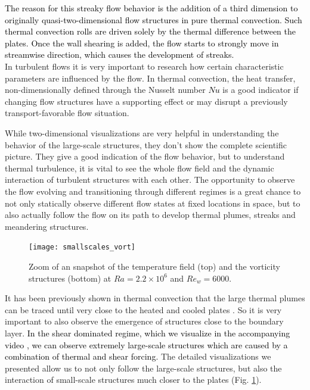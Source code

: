 \documentclass[5p,times]{elsarticle}
\begin{document}
\textcolor{black}{The reason for this streaky flow behavior is the addition of a third dimension to originally quasi-two-dimensional flow structures in pure thermal convection. Such thermal convection rolls are driven solely by the thermal difference between the plates. Once the wall shearing is added, the flow starts to strongly move in streamwise direction, which causes the development of streaks.} \\

In turbulent flows it is very important to research how certain characteristic
parameters are influenced by the flow. In thermal convection, the heat transfer, non-dimensionally
defined through the Nusselt number \textcolor{black}{$Nu$} is a good indicator if changing flow structures have a supporting effect or may disrupt a previously transport-favorable flow situation. 




While two-dimensional visualizations are very helpful in understanding the behavior of the large-scale structures, they don't show the complete scientific picture. They give a good indication of the flow behavior, but to understand thermal turbulence, it is vital to see the whole flow field and the dynamic interaction of turbulent structures with each other.
The opportunity to observe the flow evolving and transitioning through different regimes is a great chance to not only statically observe different flow states at fixed locations in space, but to also actually follow the flow on its path to develop thermal plumes, streaks and meandering structures.


\begin{figure}
	\centering
	\texttt{[image: smallscales\_vort]}%
	\caption{\label{fig:smallscale} Zoom of an snapshot of the temperature field (top) and the vorticity structures (bottom) at $ Ra=2.2 \times 10^6 $ and $ Re_w=6000 $.}
\end{figure}

It has been previously shown in thermal convection that the large thermal plumes can be traced until very close to the heated and cooled plates \cite{ste18}. So it is very important to also observe the emergence of structures close to the boundary layer. \textcolor{black}{In the shear dominated regime, which we visualize in the accompanying video \cite{fav18}, we can observe extremely large-scale structures which are caused by a combination of thermal and shear forcing.} The detailed visualizations we presented allow us to not only follow the large-scale structures, but also the interaction of small-scale structures much closer to the plates (Fig. \ref{fig:smallscale}). \\
\end{document}
